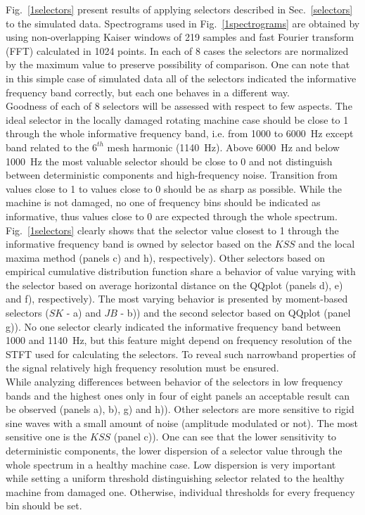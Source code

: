 \documentclass[3p,times]{elsarticle}
\begin{document}
Fig.~\ref{1selectors} present results of applying selectors described in Sec.~\ref{selectors} to the simulated data. Spectrograms used in Fig.~\ref{1spectrograms} are obtained by using non-overlapping Kaiser windows of 219 samples and fast Fourier transform (FFT) calculated in 1024 points. In each of 8 cases the selectors are normalized by the maximum value to preserve possibility of comparison. One can note that in this simple case of simulated data all of the selectors indicated the informative frequency band correctly, but each one behaves in a different way.\\
Goodness of each of 8 selectors will be assessed with respect to few aspects. The ideal selector in the locally damaged rotating machine case should be close to 1 through the whole informative frequency band, i.e. from 1000 to 6000~Hz except band related to the $6^{th}$ mesh harmonic (1140~Hz). Above 6000~Hz and below 1000~Hz the most valuable selector should be close to 0 and not distinguish between deterministic components and high-frequency noise. Transition from values close to 1 to values close to 0 should be as sharp as possible. While the machine is not damaged, no one of frequency bins should be indicated as informative, thus values close to 0 are expected through the whole spectrum.\\
Fig.~\ref{1selectors} clearly shows that the selector value closest to 1 through the informative frequency band is owned by selector based on the $KSS$ and the local maxima method (panels c) and h), respectively).  Other selectors based on empirical cumulative distribution function share a behavior of value varying with the selector based on average horizontal distance on the QQplot (panels d), e) and f), respectively). The most varying behavior is presented by moment-based selectors ($SK$ - a) and $JB$ - b)) and the second selector based on QQplot (panel g)). No one selector clearly indicated the informative frequency band between 1000 and 1140~Hz, but this feature might depend on frequency resolution of the STFT used for calculating the selectors. To reveal such narrowband properties of the signal relatively high frequency resolution must be ensured.\\
While analyzing differences between behavior of the selectors in low frequency bands and the highest ones only in four of eight panels an acceptable result can be observed (panels a), b), g) and h)). Other selectors are more sensitive to rigid sine waves with a small amount of noise (amplitude modulated or not). The most sensitive one is the $KSS$ (panel c)). One can see that the lower sensitivity to deterministic components, the lower dispersion of a selector value through the whole spectrum in a healthy machine case. Low dispersion is very important while setting a uniform threshold distinguishing selector related to the healthy machine from damaged one. Otherwise, individual thresholds for every frequency bin should be set.\\
\end{document}
